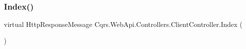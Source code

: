 \subsubsection{\texorpdfstring{Index()}{Index()}}
{\footnotesize\ttfamily virtual Http\+Response\+Message Cqrs.\+Web\+Api.\+Controllers.\+Client\+Controller.\+Index (\begin{DoxyParamCaption}{ }\end{DoxyParamCaption})\hspace{0.3cm}{\ttfamily [virtual]}}

